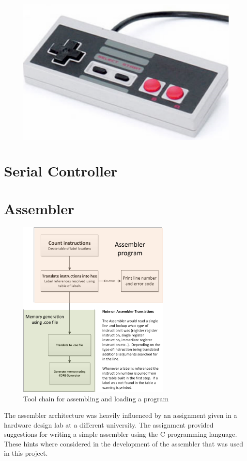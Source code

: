 \documentclass{article}
\begin{document}
\begin{figure}[h!]
	\centering
	\includegraphics[width = .5\textwidth]{nescontroller.png}
	\label{nes}
\end{figure}

\section{Serial Controller}

\section{Assembler}

\begin{figure}[h!]
	\centering
	\includegraphics[width = 3in]{assembler_diagram.png}
	\caption{Tool chain for assembling and loading a program}
	\label{fig:assembler}
\end{figure}

The assembler architecture was heavily influenced by an assignment given in a hardware design lab at a different university.\cite{Assembler}  The assignment provided suggestions for writing a simple assembler using the C programming language.  These hints where considered in the development of the assembler that was used in this project.
\end{document}

